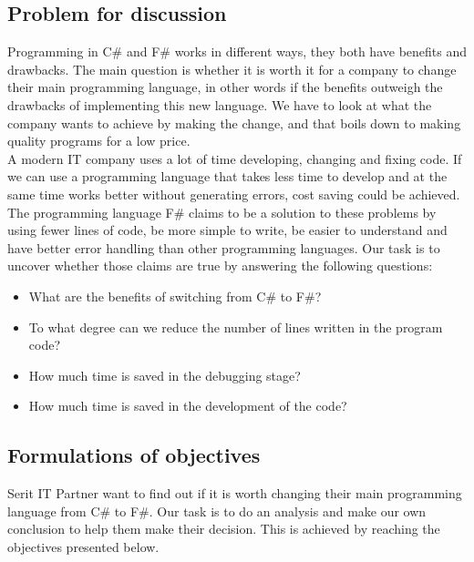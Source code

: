\documentclass[12pt, a4paper]{article}
\begin{document}
\newpage
\subsection{Problem for discussion}
Programming in C\# and F\# works in different ways, they both have benefits and drawbacks. The main question is whether it is worth it for a company to change their main programming language, in other words if the benefits outweigh the drawbacks of implementing this new language. We have to look at what the company wants to achieve by making the change, and that boils down to making quality programs for a low price. \\

A modern IT company uses a lot of time developing, changing and fixing code. If we can use a programming language that takes less time to develop and at the same time works better without generating errors, cost saving could be achieved.\\

The programming language F\# claims to be a solution to these problems by using fewer lines of code, be more simple to write, be easier to understand and have better error handling than other programming languages. Our task is to uncover whether those claims are true by answering the following questions:

\begin{itemize}
\item What are the benefits of switching from C\# to F\#?
\item To what degree can we reduce the number of lines written in the program code?
\item How much time is saved in the debugging stage?
\item How much time is saved in the development of the code?
\end{itemize}

\newpage

\subsection{Formulations of objectives}

Serit IT Partner want to find out if it is worth changing their main programming language from C\# to F\#. Our task is to do an analysis and make our own conclusion to help them make their decision. This is achieved by reaching the objectives presented below.
\end{document}
